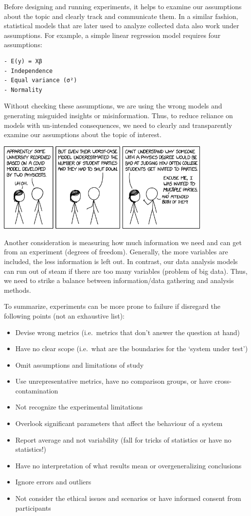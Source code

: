 \documentclass[openany]{book}
\providecommand{\tightlist}{%
  \setlength{\itemsep}{0pt}\setlength{\parskip}{0pt}}
\begin{document}
Before designing and running experiments, it helps to examine our assumptions about the topic and clearly track and communicate them. In a similar fashion, statistical models that are later used to analyze collected data also work under assumptions. For example, a simple linear regression model requires four assumptions:

\begin{verbatim}
- E(y) = Xβ
- Independence
- Equal variance (σ²)
- Normality
\end{verbatim}

Without checking these assumptions, we are using the wrong models and generating misguided insights or misinformation. Thus, to reduce reliance on models with un-intended consequences, we need to clearly and transparently examine our assumptions about the topic of interest.

\includegraphics[width=0.8\textwidth,height=\textheight]{fig/modeling_gonewrong.png}

Another consideration is measuring how much information we need and can get from an experiment (degrees of freedom). Generally, the more variables are included, the less information is left out.
In contrast, our data analysis models can run out of steam if there are too many variables (problem of big data). Thus, we need to strike a balance between information/data gathering and analysis methods.

To summarize, experiments can be more prone to failure if disregard the following points (not an exhaustive list):

\begin{itemize}
\tightlist
\item
  Devise wrong metrics (i.e.~metrics that don't answer the question at hand)
\item
  Have no clear scope (i.e.~what are the boundaries for the `system under test')
\item
  Omit assumptions and limitations of study
\item
  Use unrepresentative metrics, have no comparison groups, or have cross-contamination
\item
  Not recognize the experimental limitations
\item
  Overlook significant parameters that affect the behaviour of a system
\item
  Report average and not variability (fall for tricks of statistics or have no statistics!)
\item
  Have no interpretation of what results mean or overgeneralizing conclusions
\item
  Ignore errors and outliers
\item
  Not consider the ethical issues and scenarios or have informed consent from participants
\end{itemize}
\end{document}
